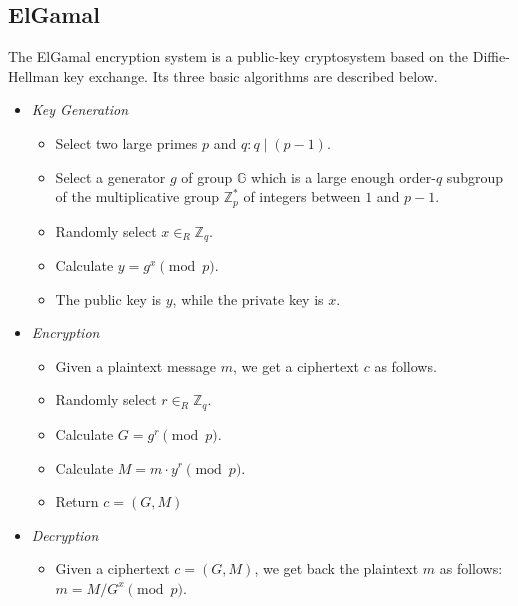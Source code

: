 \subsection{ElGamal}
The ElGamal encryption system is a public-key cryptosystem based on the Diffie-Hellman key exchange. Its three basic algorithms are described below.

\begin{itemize}
  \item \textit{Key Generation}
  \begin{itemize}
    \item Select two large primes $ p $ and $ q : q \mid (p - 1)$.
    \item Select a generator $ g $ of group $\mathbb{G}$ which is a large enough order-$ q $ subgroup of the multiplicative group $\mathbb{Z}_{p}^{*}$ of integers between $ 1 $ and $p - 1$.
    \item Randomly select $ x \in_{R} \mathbb{Z}_{q}$.
    \item Calculate $y = g^{x} \pmod{p}$.
    \item The public key is $ y $, while the private key is $ x $.
  \end{itemize}
  \item \textit{Encryption}
  \begin{itemize}
    \item Given a plaintext message $ m $, we get a ciphertext $c$ as follows.
    \item Randomly select $r \in_{R} \mathbb{Z}_{q}$.
    \item Calculate $G = g^{r} \pmod{p}$.
    \item Calculate $M = m \cdot y^{r} \pmod{p}$.
    \item Return $c = (G,M)$
  \end{itemize}
  \item \textit{Decryption}
  \begin{itemize}
    \item Given a ciphertext $ c = (G,M)$, we get back the plaintext $ m $ as follows: $m = M/G^{x}\pmod{p}$.
  \end{itemize}
\end{itemize}



